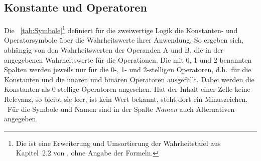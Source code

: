 \documentclass[english,ngerman,parskip=half,headsepline,footsepline]{scrreprt}
\makeatletter
\newcommand{\textdh}{d.\@ h.\@}
\makeatother
\begin{document}
	\subsection{Konstante und Operatoren}
	\label{sub:Operatoren}

	Die \tablename~\vref{tab:Symbole}\footnote{ Die \tablename ist eine Erweiterung und Umsortierung der Wahrheitstafel aus Kapitel~2.2 von \cite{bib:Junktor}, ohne Angabe der Formeln.} definiert für die zweiwertige Logik die Konstanten- und Operatorsymbole über die Wahrheitswerte ihrer Anwendung. So ergeben sich, abhängig von den Wahrheitswerten der Operanden A und B, die in der \tablename angegebenen Wahrheitswerte für die Operationen. Die mit 0, 1 und 2 benannten Spalten werden jeweils nur für die 0-, 1- und 2-stelligen Operatoren, \textdh\ für die Konstanten und die unären und binären Operatoren ausgefüllt. Dabei werden die Konstanten als 0-stellige Operatoren angesehen. Hat der Inhalt einer Zelle keine Relevanz, so bleibt sie leer, ist kein Wert bekannt, steht dort ein Minuszeichen. \textendash\ Für die Symbole und Namen sind in der Spalte \emph{Namen} auch Alternativen angegeben.
\end{document}

